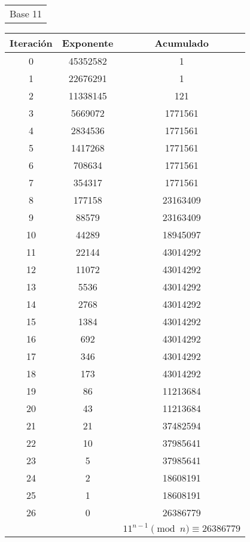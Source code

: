 \documentclass[fleqn]{article}
\begin{document}
\begin{center}
        \newpage
        \begin{tabular}{c}
            Base 11 \\
        \end{tabular}
        \begin{tabular}{c | c | c}
            Iteración & Exponente & Acumulado \\ \hline
            0 & 45352582 & 1 \\
            1 & 22676291 & 1 \\
            2 & 11338145 & 121 \\
            3 & 5669072 & 1771561 \\
            4 & 2834536 & 1771561 \\
            5 & 1417268 & 1771561 \\
            6 & 708634 & 1771561 \\
            7 & 354317 & 1771561 \\
            8 & 177158 & 23163409 \\
            9 & 88579 & 23163409 \\
            10 & 44289 & 18945097 \\
            11 & 22144 & 43014292 \\
            12 & 11072 & 43014292 \\
            13 & 5536 & 43014292 \\
            14 & 2768 & 43014292 \\
            15 & 1384 & 43014292 \\
            16 & 692 & 43014292 \\
            17 & 346 & 43014292 \\
            18 & 173 & 43014292 \\
            19 & 86 & 11213684 \\
            20 & 43 & 11213684 \\
            21 & 21 & 37482594 \\
            22 & 10 & 37985641 \\
            23 & 5 & 37985641 \\
            24 & 2 & 18608191 \\
            25 & 1 & 18608191 \\
            26 & 0 & 26386779 \\ \hline
            && $ 11^{n-1} \pmod{n} \equiv 26386779 $
        \end{tabular}
    \end{center} 
\end{document}
